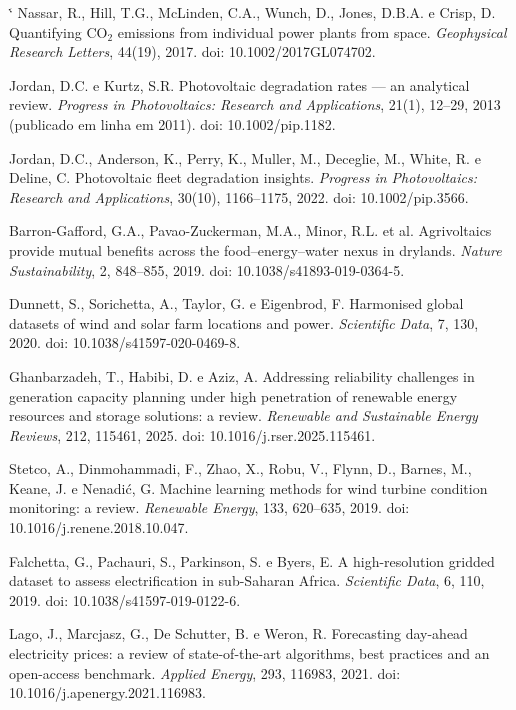\documentclass[10pt,a4paper,oneside]{book}
\makeatletter
\renewenvironment{thebibliography}[1]
  {\list{\@biblabel{\@arabic\c@enumiv}}%
     {\settowidth\labelwidth{\@biblabel{#1}}%
      \leftmargin\labelwidth \advance\leftmargin\labelsep
      \usecounter{enumiv}\let\p@enumiv\@empty
      \renewcommand\theenumiv{\@arabic\c@enumiv}}%
   \sloppy\clubpenalty4000 \@clubpenalty\clubpenalty
   \widowpenalty4000 \sfcode`\.\@m}
  {\endlist}
\makeatother
\begin{document}
\begin{landscape}
{\begin{thebibliography}{99}
 Nassar, R., Hill, T.G., McLinden, C.A., Wunch, D., Jones,
  D.B.A. e Crisp, D. Quantifying CO$_2$ emissions from individual power plants
  from space. \emph{Geophysical Research Letters}, 44(19), 2017.
  doi: 10.1002/2017GL074702.

 Jordan, D.C. e Kurtz, S.R. Photovoltaic degradation
  rates --- an analytical review. \emph{Progress in Photovoltaics: Research and
  Applications}, 21(1), 12--29, 2013 (publicado em linha em 2011).
  doi: 10.1002/pip.1182.

 Jordan, D.C., Anderson, K., Perry, K., Muller, M.,
  Deceglie, M., White, R. e Deline, C. Photovoltaic fleet degradation insights.
  \emph{Progress in Photovoltaics: Research and Applications}, 30(10),
  1166--1175, 2022. doi: 10.1002/pip.3566.

 Barron-Gafford, G.A., Pavao-Zuckerman, M.A., Minor,
  R.L. et al. Agrivoltaics provide mutual benefits across the food--energy--water
  nexus in drylands. \emph{Nature Sustainability}, 2, 848--855, 2019.
  doi: 10.1038/s41893-019-0364-5.

 Dunnett, S., Sorichetta, A., Taylor, G. e Eigenbrod, F.
  Harmonised global datasets of wind and solar farm locations and power.
  \emph{Scientific Data}, 7, 130, 2020. doi: 10.1038/s41597-020-0469-8.

 Ghanbarzadeh, T., Habibi, D. e Aziz, A. Addressing
  reliability challenges in generation capacity planning under high penetration
  of renewable energy resources and storage solutions: a review. \emph{Renewable
  and Sustainable Energy Reviews}, 212, 115461, 2025.
  doi: 10.1016/j.rser.2025.115461.

 Stetco, A., Dinmohammadi, F., Zhao, X., Robu, V., Flynn,
  D., Barnes, M., Keane, J. e Nenadi\'c, G. Machine learning methods for wind
  turbine condition monitoring: a review. \emph{Renewable Energy}, 133,
  620--635, 2019. doi: 10.1016/j.renene.2018.10.047.

 Falchetta, G., Pachauri, S., Parkinson, S. e Byers, E.
  A high-resolution gridded dataset to assess electrification in sub-Saharan
  Africa. \emph{Scientific Data}, 6, 110, 2019.
  doi: 10.1038/s41597-019-0122-6.

 Lago, J., Marcjasz, G., De Schutter, B. e Weron, R.
  Forecasting day-ahead electricity prices: a review of state-of-the-art
  algorithms, best practices and an open-access benchmark. \emph{Applied
  Energy}, 293, 116983, 2021. doi: 10.1016/j.apenergy.2021.116983.


\end{thebibliography}}
\end{landscape}
\end{document}

